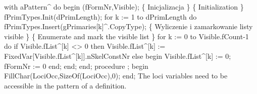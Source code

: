    with aPattern^ do
   begin
      (fFormNr,Visible);
      \{ Inicjalizacja \} \{ Initialization \}
      fPrimTypes.Init(dPrimLength);
      for k := 1 to dPrimLength do
         fPrimTypes.Insert(gPrimaries[k]^.CopyType);
      \{ Wyliczenie i zamarkowanie listy visible \}
      \{ Enumerate and mark the visible list \}
      for k := 0 to Visible.fCount-1 do
         if Visible.fList^[k] <> 0 then
            Visible.fList^[k] := FixedVar[Visible.fList^[k]].nSkelConstNr
         else begin
            Visible.fList^[k] := 0;
            fFormNr := 0
         end;
   end;
end;
\eatline
{}\nwendcode{}\nwdocspar
\nwenddocs{}\endmoddef\nwstartdeflinemarkup{}\nwenddeflinemarkup
procedure ;
begin
   FillChar(LociOcc,SizeOf(LociOcc),0);
end;
\eatline
{}\nwendcode{}\nwdocspar
The loci variables need to be accessible in the pattern of a definition.

